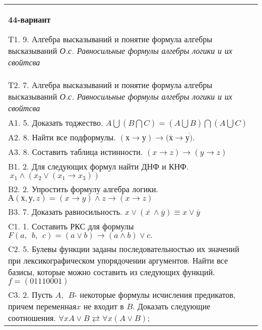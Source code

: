 \documentclass{article}
\begin{document}
\begin{tabular}{m{17cm}}
\textbf{44-вариант}
\newline

T1. 9. Алгебра высказываний и понятие формула алгебры высказываний \emph{О.с. Равносильные формулы алгебры логики и их свойтсва} \\
T2. 7. Алгебра высказываний и понятие формула алгебры высказываний \emph{О.с. Равносильные формулы алгебры логики и их свойтсва} \\
A1. 5. Доказать тоджество. \(A\bigcup(B\bigcap C) = (A\bigcup B)\bigcap(A\bigcup C)\) \\
A2. 8. Найти все подформулы. \((х \rightarrow у) \rightarrow (\overline{х} \rightarrow \overline{у)}\). \\
A3. 8. Составить таблица истинности. \((x \rightarrow z) \rightarrow (y \rightarrow z)\) \\
B1. 2. Для следующих формул найти ДНФ и КНФ. \(\ x_{1} \land (x_{2} \vee (x_{1} \rightarrow x_{3}))\) \\
B2. 2. Упростить формулу алгебра логики. \(А(х,у,z) = (x \rightarrow y) \land z \rightarrow (x \rightarrow z)\) \\
B3. 7. Доказать равносильность. \(x \vee \left( \overline{x\ } \land \overline{y} \right) \equiv x \vee \overline{y}\) \\
C1. 1. Составить РКС для формулы \(F(a,\ \ b,\ \ c) = (a \vee b) \rightarrow (a \land b) \vee c.\) \\
C2. 5. Булевы функции заданы последовательностью их значений при лексикографическом упорядочении аргументов. Найти все базисы, которые можно составить из следующих функций. \(f = (01110001)\) \\
C3. 2. Пусть \(A,\ \ B\)- некоторые формулы исчисления предикатов, причем переменная\(x\) не входит в \(B\). Доказать следующие соотношения. \(\forall xA \vee B \rightleftarrows \forall x(A \vee B)\); \\

\end{tabular}
\vspace{1cm}
\end{document}
